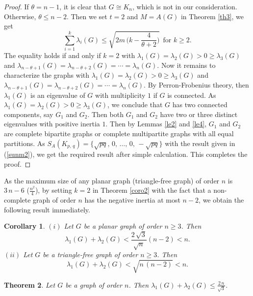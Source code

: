 \documentclass[12pt]{article}
\newtheorem{theorem}{Theorem}[section]
\newtheorem{corollary}[theorem]{Corollary}
\begin{document}
 \begin{proof}
 If $\theta=n-1$, it is clear that $G\cong K_n$, which is not in our consideration. Otherwise, $\theta\leq n-2$.
 Then we set $t=2$ and $M=A(G)$ in Theorem \ref{th3}, we get
    $$\sum_{i=1}^{k}\lambda_i(G)\leq\sqrt{2m\,\Big(k-\frac{4}{\theta+2}\Big)}~~\mbox{for }k\geq 2.$$
 The equality holds if and only if $k=2$ with $\lambda_1(G)=\lambda_2(G)>0\geq\lambda_3(G)$ and $\lambda_{n-\theta+1}(G)=\lambda_{n-\theta+2}(G)=\cdots=\lambda_n(G)$.
 Now it remains to characterize the graphs with $\lambda_1(G)=\lambda_2(G)>0\geq\lambda_3(G)$ and $\lambda_{n-\theta+1}(G)=\lambda_{n-\theta+2}(G)=\cdots=\lambda_n(G)$.
 By Perron-Frobenius theory, then $\lambda_1(G)$ is an eigenvalue of $G$ with multiplicity $1$ if $G$ is connected.
 As $\lambda_1(G)=\lambda_2(G)>0\geq\lambda_3(G)$, we conclude that $G$ has two connected
 components, say $G_1$ and $G_2$. Then both $G_1$ and $G_2$ have two
 or three distinct eigenvalues with positive inertia $1$. Then by Lemmas \ref{le2} and
 \ref{le4},  $G_1$ and $G_2$ are complete bipartite graphs or complete multipartite graphs with all equal partitions.
  As $S_A(K_{p,\,q})=\Big\{\sqrt{pq},\,0,\,\ldots,\,0,\,-\sqrt{pq}\Big\}$
  with the result given in (\ref{sunm2}), we get the required result after
  simple calculation. This completes the proof.
  \end{proof}
  As the maximum size of any planar graph (triangle-free graph) of order
  $n$ is $3\,n-6$ ($\frac{n^2}{4}$), by setting $k=2$ in Theorem \ref{coro2} with the fact that
  a non-complete graph of order $n$ has the negative inertia at most $n-2$,
  we obtain the following result immediately.

  \begin{corollary} \label{coro3}
  $(i)$ Let $G$ be a planar graph of order $n\geq 3$. Then  
   $$\lambda_1(G)+\lambda_2(G)<\frac{2\,\sqrt{3}}{\sqrt{n}}(n-2)<n.$$
  $(ii)$ Let $G$ be a triangle-free graph of order $n\geq 3$. Then  
    $$\lambda_1(G)+\lambda_2(G)< \sqrt{n\,(n-2)}<n.$$
  \end{corollary}

  \begin{theorem} \label{nth1} {\rm \cite{NIK}} Let $G$ be a graph of order
   $n$. Then $\lambda_1(G)+\lambda_2(G)\leq \frac{2\,n}{\sqrt{3}}$.
 \end{theorem}
\end{document}
